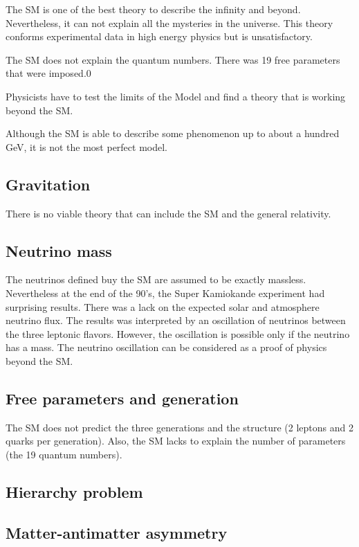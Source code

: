  The SM is one of the best theory to describe the infinity and beyond. 
  Nevertheless, it can not explain all the mysteries in the universe. 
  This theory conforms experimental data in high energy physics but is unsatisfactory.
  
  The SM does not explain the quantum numbers. There was 19 free parameters that were imposed.0 

  Physicists have to test the limits of the Model and find a theory that is working beyond the SM. 

  Although the SM is able to describe some phenomenon up to about a hundred GeV, it is not the most perfect model.

    \subsection{Gravitation}
    There is no viable theory that can include the SM and the general relativity.

    \subsection{Neutrino mass}

    The neutrinos defined buy the SM are assumed to be exactly massless.
    Nevertheless at the end of the 90's, the Super Kamiokande experiment had surprising results.
    There was a lack on the expected solar and atmosphere neutrino flux. 
    The results was interpreted by an oscillation of neutrinos between the three leptonic flavors.
    However, the oscillation is possible only if the neutrino has a mass.
    The neutrino oscillation can be considered as a proof of physics beyond the SM.

    \subsection{Free parameters and generation}

    The SM does not predict the three generations and the structure (2 leptons and 2 quarks per generation). 
    Also, the SM lacks to explain the number of parameters (the 19 quantum numbers).

    \subsection{Hierarchy problem}

    \subsection{Matter-antimatter asymmetry}

